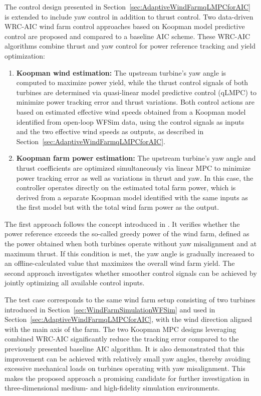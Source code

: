 The control design presented in Section~\ref{sec:AdaptiveWindFarmqLMPCforAIC} is extended to include yaw control in addition to thrust control. Two data-driven WRC-AIC wind farm control approaches based on Koopman model predictive control are proposed and compared to a baseline AIC scheme. These WRC-AIC algorithms combine thrust and yaw control for power reference tracking and yield optimization:
\begin{enumerate}
    \item \textbf{Koopman wind estimation:}  
    The upstream turbine's yaw angle is computed to maximize power yield, while the thrust control signals of both turbines are determined via quasi-linear model predictive control (qLMPC) to minimize power tracking error and thrust variations. Both control actions are based on estimated effective wind speeds obtained from a Koopman model identified from open-loop WFSim data, using the control signals as inputs and the two effective wind speeds as outputs, as described in Section~\ref{sec:AdaptiveWindFarmqLMPCforAIC}.
    
    \item \textbf{Koopman farm power estimation:}  
    The upstream turbine's yaw angle and thrust coefficients are optimized simultaneously via linear MPC to minimize power tracking error as well as variations in thrust and yaw. In this case, the controller operates directly on the estimated total farm power, which is derived from a separate Koopman model identified with the same inputs as the first model but with the total wind farm power as the output.
\end{enumerate}
The first approach follows the concept introduced in \cite{boersma2017tutorial}. It verifies whether the power reference exceeds the so-called greedy power of the wind farm, defined as the power obtained when both turbines operate without yaw misalignment and at maximum thrust. If this condition is met, the yaw angle is gradually increased to an offline-calculated value that maximizes the overall wind farm yield. The second approach investigates whether smoother control signals can be achieved by jointly optimizing all available control inputs.

The test case corresponds to the same wind farm setup consisting of two turbines introduced in Section~\ref{sec:WindFarmSimulationWFSim} and used in Section~\ref{sec:AdaptiveWindFarmqLMPCforAIC}, with the wind direction aligned with the main axis of the farm. The two Koopman MPC designs leveraging combined WRC-AIC significantly reduce the tracking error compared to the previously presented baseline AIC algorithm. It is also demonstrated that this improvement can be achieved with relatively small yaw angles, thereby avoiding excessive mechanical loads on turbines operating with yaw misalignment. This makes the proposed approach a promising candidate for further investigation in three-dimensional medium- and high-fidelity simulation environments.

